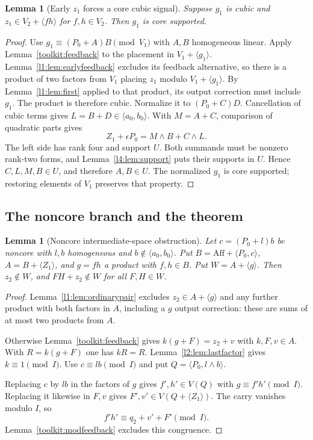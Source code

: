 \documentclass[11pt,a4paper]{article}
\theoremstyle{plain}
\newtheorem{lemma}[theorem]{Lemma}
\theoremstyle{remark}
\theoremstyle{plain}
\newcommand{\Aff}{\mathrm{Aff}}
\begin{document}
\begin{lemma}[Early $z_1$ forces a core cubic signal]\label{l1:lem:earlycore}
Suppose $g_1$ is cubic and $z_1\in V_2+\langle fh\rangle$ for $f,h\in V_2$. Then $g_1$ is core supported.
\end{lemma}
\begin{proof}
Use $g_1\equiv(P_0+A)B\pmod{V_1}$ with $A,B$ homogeneous linear. Apply Lemma~\ref{toolkit:feedback} to the placement in $V_1+\langle g_1\rangle$. Lemma~\ref{l1:lem:earlyfeedback} excludes its feedback alternative, so there is a product of two factors from $V_1$ placing $z_1$ modulo $V_1+\langle g_1\rangle$. By Lemma~\ref{l1:lem:first} applied to that product, its output correction must include $g_1$. The product is therefore cubic. Normalize it to $(P_0+C)D$. Cancellation of cubic terms gives $L=B+D\in\langle a_0,b_0\rangle$. With $M=A+C$, comparison of quadratic parts gives
\[
Z_1+\epsilon P_0=M\wedge B+C\wedge L.
\]
The left side has rank four and support $U$. Both summands must be nonzero rank-two forms, and Lemma~\ref{l4:lem:support} puts their supports in $U$. Hence $C,L,M,B\in U$, and therefore $A,B\in U$. The normalized $g_1$ is core supported; restoring elements of $V_1$ preserves that property.

\end{proof}

\subsection{The noncore branch and the theorem}
\begin{lemma}[Noncore intermediate-space obstruction]\label{l1:lem:noncore}
Let $c=(P_0+l)b$ be noncore with $l,b$ homogeneous and $b\notin\langle a_0,b_0\rangle$. Put $B=\Aff+\langle P_0,c\rangle$, $A=B+\langle Z_1\rangle$, and $g=fh$ a product with $f,h\in B$. Put $W=A+\langle g\rangle$. Then $z_2\notin W$, and $FH+z_2\notin W$ for all $F,H\in W$.
\end{lemma}
\begin{proof}
Lemma~\ref{l1:lem:ordinarypair} excludes $z_2\in A+\langle g\rangle$ and any further product with both factors in $A$, including a $g$ output correction: these are sums of at most two products from $A$.

Otherwise Lemma~\ref{toolkit:feedback} gives $k(g+F)=z_2+v$ with $k,F,v\in A$. With $R=k(g+F)$ one has $kR=R$. Lemma~\ref{l2:lem:lastfactor} gives $k\equiv1\pmod I$. Use $c\equiv lb\pmod I$ and put $Q=\langle P_0,l\wedge b\rangle$.

Replacing $c$ by $lb$ in the factors of $g$ gives $f',h'\in V(Q)$ with $g\equiv f'h'\pmod I$. Replacing it likewise in $F,v$ gives $F',v'\in V(Q+\langle Z_1\rangle)$. The carry vanishes modulo $I$, so
\[
f'h'\equiv q_2+v'+F'\pmod I.
\]
Lemma~\ref{toolkit:modfeedback} excludes this congruence.
\end{proof}
\end{document}
